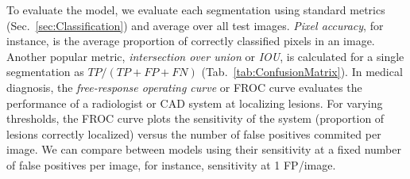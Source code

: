 To evaluate the model, we evaluate each segmentation using standard metrics (Sec.~\ref{sec:Classification}) and average over all test images. \emph{Pixel accuracy}, for instance, is the average proportion of correctly classified pixels in an image.
Another popular metric, \emph{intersection over union} or \emph{IOU}, is calculated for a single segmentation as $TP/(TP+FP+FN)$ (Tab.~\ref{tab:ConfusionMatrix}).
In medical diagnosis, the \emph{free-response operating curve} or {FROC curve} evaluates the performance of a radiologist or CAD system at localizing lesions. For varying thresholds, the FROC curve plots the sensitivity of the system (proportion of lesions correctly localized) versus the number of false positives commited per image. We can compare between models using their sensitivity at a fixed number of false positives per image, for instance, sensitivity at 1 FP/image.

